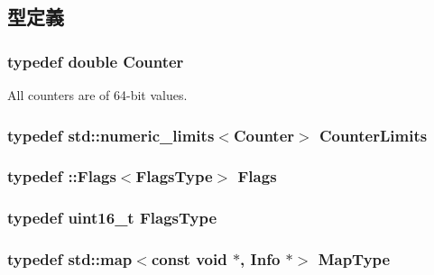 \subsection{型定義}
\hypertarget{namespaceStats_ac35128c026c72bb36af9cea00774e8a6}{
\subsubsection[{Counter}]{\setlength{\rightskip}{0pt plus 5cm}typedef double {\bf Counter}}}
\label{namespaceStats_ac35128c026c72bb36af9cea00774e8a6}
All counters are of 64-\/bit values. \hypertarget{namespaceStats_a2527a6ff61a21b98505eb75fcda53749}{
\subsubsection[{CounterLimits}]{\setlength{\rightskip}{0pt plus 5cm}typedef std::numeric\_\-limits$<${\bf Counter}$>$ {\bf CounterLimits}}}
\label{namespaceStats_a2527a6ff61a21b98505eb75fcda53749}
\hypertarget{namespaceStats_ad6cda6b0b8d7ddfbf8e769082577b482}{
\subsubsection[{Flags}]{\setlength{\rightskip}{0pt plus 5cm}typedef ::{\bf Flags}$<${\bf FlagsType}$>$ {\bf Flags}}}
\label{namespaceStats_ad6cda6b0b8d7ddfbf8e769082577b482}
\hypertarget{namespaceStats_ac52f827dcfea58febdc3860fd610dc09}{
\subsubsection[{FlagsType}]{\setlength{\rightskip}{0pt plus 5cm}typedef uint16\_\-t {\bf FlagsType}}}
\label{namespaceStats_ac52f827dcfea58febdc3860fd610dc09}
\hypertarget{namespaceStats_a2cc2598bf16648653f0799b7dd5b5098}{
\subsubsection[{MapType}]{\setlength{\rightskip}{0pt plus 5cm}typedef std::map$<$const void $\ast$, {\bf Info} $\ast$$>$ {\bf MapType}}}
\label{namespaceStats_a2cc2598bf16648653f0799b7dd5b5098}
